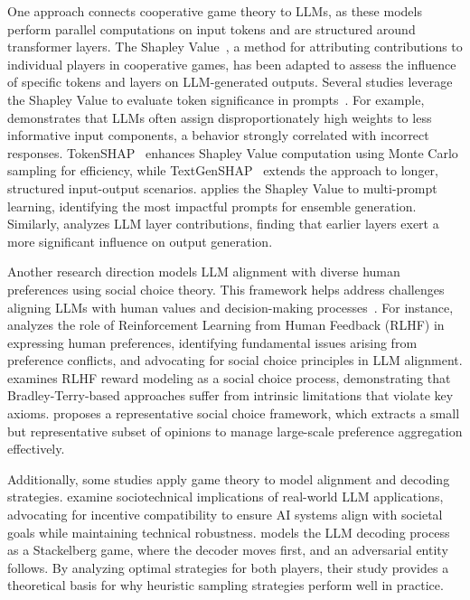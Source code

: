 One approach connects cooperative game theory to LLMs, as these models perform parallel computations on input tokens and are structured around transformer layers. 
The Shapley Value~\cite{shapley1953value}, a method for attributing contributions to individual players in cooperative games, has been adapted to assess the influence of specific tokens and layers on LLM-generated outputs. 
Several studies leverage the Shapley Value to evaluate token significance in prompts~\cite{goldshmidt2024tokenshap,mohammadi2024wait}. For example, \cite{mohammadi2024wait} demonstrates that LLMs often assign disproportionately high weights to less informative input components, a behavior strongly correlated with incorrect responses. 
TokenSHAP~\cite{goldshmidt2024tokenshap} enhances Shapley Value computation using Monte Carlo sampling for efficiency, while TextGenSHAP~\cite{enouen2023textgenshap} extends the approach to longer, structured input-output scenarios. 
\cite{liu2023prompt} applies the Shapley Value to multi-prompt learning, identifying the most impactful prompts for ensemble generation. 
Similarly, \cite{zhang2024investigating} analyzes LLM layer contributions, finding that earlier layers exert a more significant influence on output generation.

Another research direction models LLM alignment with diverse human preferences using social choice theory.
This framework helps address challenges aligning LLMs with human values and decision-making processes~\cite{mishra2023ai}.
For instance, \cite{conitzerposition} analyzes the role of Reinforcement Learning from Human Feedback (RLHF) in expressing human preferences, identifying fundamental issues arising from preference conflicts, and advocating for social choice principles in LLM alignment. 
\cite{ge2024axioms} examines RLHF reward modeling as a social choice process, demonstrating that Bradley-Terry-based approaches suffer from intrinsic limitations that violate key axioms. 
\cite{qiu2024representative} proposes a representative social choice framework, which extracts a small but representative subset of opinions to manage large-scale preference aggregation effectively.

Additionally, some studies apply game theory to model alignment and decoding strategies. 
\cite{zhang2024incentive} examine sociotechnical implications of real-world LLM applications, advocating for incentive compatibility to ensure AI systems align with societal goals while maintaining technical robustness. 
\cite{chen2024decoding} models the LLM decoding process as a Stackelberg game, where the decoder moves first, and an adversarial entity follows. 
By analyzing optimal strategies for both players, their study provides a theoretical basis for why heuristic sampling strategies perform well in practice.

